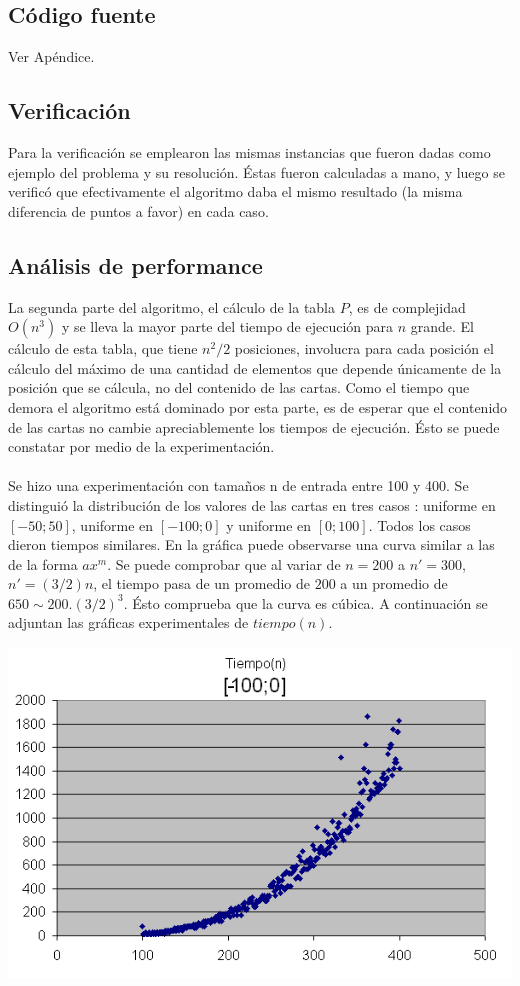 \subsection{C\'odigo fuente}
Ver Ap\'endice.

\subsection{Verificaci\'on}
Para la verificaci\'on se emplearon las mismas instancias que fueron dadas como ejemplo del problema y su resoluci\'on. \'Estas fueron calculadas a mano, y luego se verific\'o que efectivamente el algoritmo daba el mismo resultado (la misma diferencia de puntos a favor) en cada caso.

\subsection{An\'alisis de performance}
La segunda parte del algoritmo, el c\'alculo de la tabla $P$, es de complejidad $O(n^3)$ y se lleva la mayor parte del tiempo de ejecuci\'on para $n$ grande.
El c\'alculo de esta tabla, que tiene $n^2/2$ posiciones, involucra para cada posici\'on el c\'alculo del m\'aximo de una cantidad de elementos que depende \'unicamente de la posici\'on que se c\'alcula, no del contenido de las cartas. Como el tiempo que demora el algoritmo est\'a dominado por esta parte, es de esperar que el contenido de las cartas no cambie apreciablemente los tiempos de ejecuci\'on. \'Esto se puede constatar por medio de la experimentaci\'on.\\
\\
Se hizo una experimentaci\'on con tama\~nos n de entrada entre 100 y 400. Se distingui\'o la distribuci\'on de los valores de las cartas en tres casos : uniforme en $[-50;50]$, uniforme en $[-100;0]$ y uniforme en $[0;100]$. Todos los casos dieron tiempos similares. En la gr\'afica puede observarse una curva similar a las de la forma $ax^{m}$. Se puede comprobar que al variar de $n=200$ a $n'=300$, $n'=(3/2)n$, el tiempo pasa de un promedio de $200$ a un promedio de $650 \sim 200.(3/2)^3$. \'Esto comprueba que la curva es c\'ubica.
A continuaci\'on se adjuntan las gr\'aficas experimentales de $tiempo(n)$.

\begin{center}
	\includegraphics[scale=0.6]{images/ej1_1.png}
\end{center}

